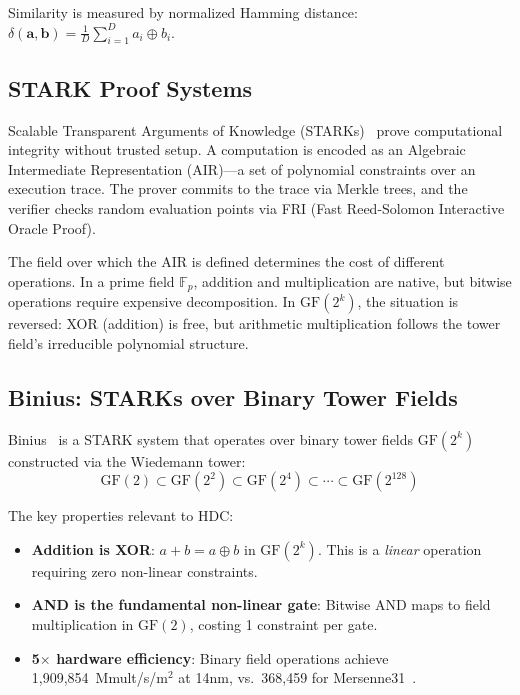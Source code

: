 \documentclass[11pt,twocolumn]{article}
\begin{document}
Similarity is measured by normalized Hamming distance: $\delta(\mathbf{a}, \mathbf{b}) = \frac{1}{D}\sum_{i=1}^{D} a_i \oplus b_i$.

\subsection{STARK Proof Systems}

Scalable Transparent Arguments of Knowledge (STARKs)~\cite{ben2018scalable} prove computational integrity without trusted setup. A computation is encoded as an Algebraic Intermediate Representation (AIR)---a set of polynomial constraints over an execution trace. The prover commits to the trace via Merkle trees, and the verifier checks random evaluation points via FRI (Fast Reed-Solomon Interactive Oracle Proof).

The field over which the AIR is defined determines the cost of different operations. In a prime field $\mathbb{F}_p$, addition and multiplication are native, but bitwise operations require expensive decomposition. In $\mathrm{GF}(2^k)$, the situation is reversed: XOR (addition) is free, but arithmetic multiplication follows the tower field's irreducible polynomial structure.

\subsection{Binius: STARKs over Binary Tower Fields}

Binius~\cite{diamond2023binius} is a STARK system that operates over binary tower fields $\mathrm{GF}(2^k)$ constructed via the Wiedemann tower:
$$\mathrm{GF}(2) \subset \mathrm{GF}(2^2) \subset \mathrm{GF}(2^4) \subset \cdots \subset \mathrm{GF}(2^{128})$$

The key properties relevant to HDC:
\begin{itemize}
    \item \textbf{Addition is XOR}: $a + b = a \oplus b$ in $\mathrm{GF}(2^k)$. This is a \emph{linear} operation requiring zero non-linear constraints.
    \item \textbf{AND is the fundamental non-linear gate}: Bitwise AND maps to field multiplication in $\mathrm{GF}(2)$, costing 1 constraint per gate.
    \item \textbf{5$\times$ hardware efficiency}: Binary field operations achieve 1,909,854~Mmult/s/\textmu m$^2$ at 14nm, vs.\ 368,459 for Mersenne31~\cite{diamond2023binius}.
\end{itemize}
\end{document}
